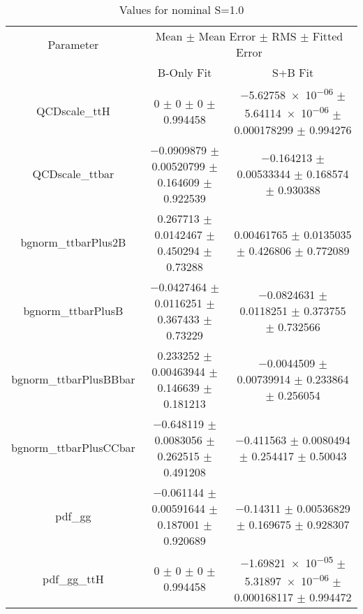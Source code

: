 \begin{table}
\centering
\caption{Values for nominal S=1.0}
\begin{tabular}{ccc}
\toprule
Parameter & \multicolumn{2}{c}{Mean $\pm$ Mean Error $\pm$ RMS $\pm$ Fitted Error}\\
 & B-Only Fit & S+B Fit\\
\midrule
QCDscale\_ttH & \num{0} $\pm$ \num{0} $\pm$ \num{0} $\pm$ \num{0.994458} & \num{-5.62758e-06} $\pm$ \num{5.64114e-06} $\pm$ \num{0.000178299} $\pm$ \num{0.994276}\\
QCDscale\_ttbar & \num{-0.0909879} $\pm$ \num{0.00520799} $\pm$ \num{0.164609} $\pm$ \num{0.922539} & \num{-0.164213} $\pm$ \num{0.00533344} $\pm$ \num{0.168574} $\pm$ \num{0.930388}\\
bgnorm\_ttbarPlus2B & \num{0.267713} $\pm$ \num{0.0142467} $\pm$ \num{0.450294} $\pm$ \num{0.73288} & \num{0.00461765} $\pm$ \num{0.0135035} $\pm$ \num{0.426806} $\pm$ \num{0.772089}\\
bgnorm\_ttbarPlusB & \num{-0.0427464} $\pm$ \num{0.0116251} $\pm$ \num{0.367433} $\pm$ \num{0.73229} & \num{-0.0824631} $\pm$ \num{0.0118251} $\pm$ \num{0.373755} $\pm$ \num{0.732566}\\
bgnorm\_ttbarPlusBBbar & \num{0.233252} $\pm$ \num{0.00463944} $\pm$ \num{0.146639} $\pm$ \num{0.181213} & \num{-0.0044509} $\pm$ \num{0.00739914} $\pm$ \num{0.233864} $\pm$ \num{0.256054}\\
bgnorm\_ttbarPlusCCbar & \num{-0.648119} $\pm$ \num{0.0083056} $\pm$ \num{0.262515} $\pm$ \num{0.491208} & \num{-0.411563} $\pm$ \num{0.0080494} $\pm$ \num{0.254417} $\pm$ \num{0.50043}\\
pdf\_gg & \num{-0.061144} $\pm$ \num{0.00591644} $\pm$ \num{0.187001} $\pm$ \num{0.920689} & \num{-0.14311} $\pm$ \num{0.00536829} $\pm$ \num{0.169675} $\pm$ \num{0.928307}\\
pdf\_gg\_ttH & \num{0} $\pm$ \num{0} $\pm$ \num{0} $\pm$ \num{0.994458} & \num{-1.69821e-05} $\pm$ \num{5.31897e-06} $\pm$ \num{0.000168117} $\pm$ \num{0.994472}\\
\bottomrule
\end{tabular}
\end{table}